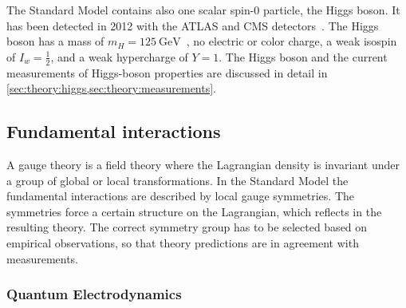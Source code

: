 The Standard Model contains also one scalar spin-0 particle, the Higgs boson.
It has been detected in 2012 with the ATLAS and CMS detectors~\cite{HiggsDiscoveryATLAS,HiggsDiscoveryCMS}.
The Higgs boson has a mass of $m_H = \SI{125}{\GeV}$~\cite{MassCombinedMeas}, no electric or color charge, a weak isospin of $I_w = \frac{1}{2}$, and a
weak hypercharge of $Y = 1$.
The Higgs boson and the current measurements of Higgs-boson properties are discussed in detail in \cref{sec:theory:higgs,sec:theory:measurements}.

\subsection{Fundamental interactions}\label{sub:theory:sm:interactions}

A gauge theory is a field theory where the Lagrangian density is invariant under a group of global or local transformations.
In the Standard Model the fundamental interactions are described by local gauge symmetries.
The symmetries force a certain structure on the Lagrangian, which reflects in the resulting theory.
The correct symmetry group has to be selected based on empirical observations, so that theory predictions are in agreement with measurements.

\subsubsection{Quantum Electrodynamics}

